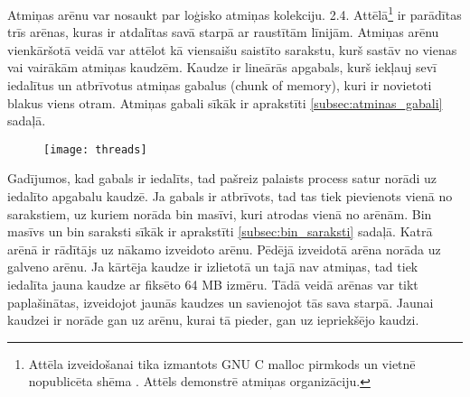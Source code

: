 Atmiņas arēnu var nosaukt par loģisko atmiņas kolekciju. 2.4. Attēlā\footnote{Attēla izveidošanai tika izmantots GNU C malloc pirmkods \cite{MALLOC} un vietnē nopublicēta shēma \cite{AMM}. Attēls demonstrē atmiņas organizāciju.} ir parādītas trīs arēnas, kuras ir atdalītas savā starpā ar raustītām līnijām.
 Atmiņas arēnu  vienkāršotā veidā var attēlot kā viensaišu saistīto sarakstu, kurš sastāv no vienas vai vairākām atmiņas kaudzēm. 
 Kaudze ir lineārās apgabals, kurš iekļauj sevī iedalītus un atbrīvotus atmiņas gabalus (chunk of memory), kuri ir novietoti blakus viens otram.
 Atmiņas gabali sīkāk ir aprakstīti \ref{subsec:atminas_gabali} sadaļā.
 \begin{figure}[h]
\begin{center}
\texttt{[image: threads]}
\end{center}
\caption{\textbf{\fontsize{11}{12}\selectfont {Atmiņas organizācija GNU C bibliotēkā (versija 2.3)}}}
\end{figure}
 Gadījumos, kad gabals ir iedalīts, tad pašreiz palaists process satur norādi uz iedalīto apgabalu kaudzē. 
 Ja gabals ir atbrīvots, tad tas tiek pievienots vienā no sarakstiem, uz kuriem norāda bin masīvi, kuri atrodas vienā no arēnām.
Bin masīvs un bin saraksti sīkāk ir aprakstīti \ref{subsec:bin_saraksti} sadaļā. 
 Katrā arēnā ir rādītājs uz nākamo izveidoto arēnu. Pēdējā izveidotā arēna norāda uz galveno arēnu.
 Ja kārtēja kaudze ir izlietotā un tajā nav atmiņas, tad tiek iedalīta jauna kaudze ar fiksēto 64 MB izmēru.
  Tādā veidā arēnas var tikt paplašinātas, izveidojot jaunās kaudzes un savienojot tās sava starpā.
 Jaunai kaudzei ir norāde gan uz arēnu, kurai tā pieder, gan uz iepriekšējo kaudzi.

